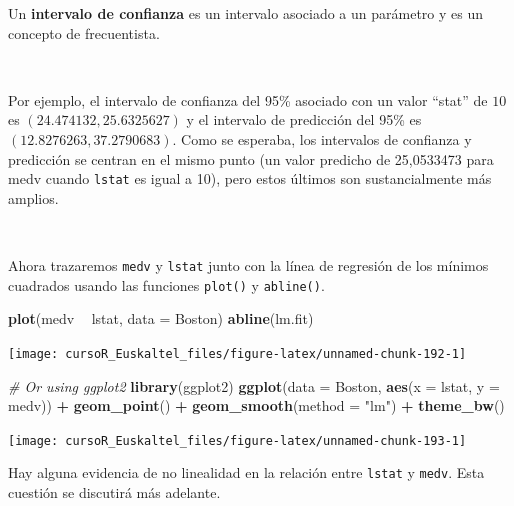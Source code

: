 \documentclass[]{book}
\newenvironment{Shaded}{\begin{snugshade}}{\end{snugshade}}
\newcommand{\KeywordTok}[1]{\textcolor[rgb]{0.13,0.29,0.53}{\textbf{#1}}}
\newcommand{\DataTypeTok}[1]{\textcolor[rgb]{0.13,0.29,0.53}{#1}}
\newcommand{\StringTok}[1]{\textcolor[rgb]{0.31,0.60,0.02}{#1}}
\newcommand{\CommentTok}[1]{\textcolor[rgb]{0.56,0.35,0.01}{\textit{#1}}}
\newcommand{\OperatorTok}[1]{\textcolor[rgb]{0.81,0.36,0.00}{\textbf{#1}}}
\newcommand{\NormalTok}[1]{#1}
\begin{document}
Un \textbf{intervalo de confianza} es un intervalo asociado a un
parámetro y es un concepto de frecuentista.

~

Por ejemplo, el intervalo de confianza del 95\% asociado con un valor
``stat'' de \(10\) es \((24.474132, 25.6325627)\) y el intervalo de
predicción del 95\% es \((12.8276263, 37.2790683)\). Como se esperaba,
los intervalos de confianza y predicción se centran en el mismo punto
(un valor predicho de 25,0533473 para medv cuando \texttt{lstat} es
igual a 10), pero estos últimos son sustancialmente más amplios.

~

Ahora trazaremos \texttt{medv} y \texttt{lstat} junto con la línea de
regresión de los mínimos cuadrados usando las funciones \texttt{plot()}
y \texttt{abline()}.

\begin{Shaded}
\begin{Highlighting}[]
\KeywordTok{plot}\NormalTok{(medv }\OperatorTok{~}\StringTok{ }\NormalTok{lstat, }\DataTypeTok{data =}\NormalTok{ Boston)}
\KeywordTok{abline}\NormalTok{(lm.fit)}
\end{Highlighting}
\end{Shaded}

\begin{center}\texttt{[image: cursoR\_Euskaltel\_files/figure-latex/unnamed-chunk-192-1]} \end{center}

\begin{Shaded}
\begin{Highlighting}[]
\CommentTok{# Or using ggplot2}
\KeywordTok{library}\NormalTok{(ggplot2)}
\KeywordTok{ggplot}\NormalTok{(}\DataTypeTok{data =}\NormalTok{ Boston, }\KeywordTok{aes}\NormalTok{(}\DataTypeTok{x =}\NormalTok{ lstat, }\DataTypeTok{y =}\NormalTok{ medv)) }\OperatorTok{+}
\StringTok{  }\KeywordTok{geom_point}\NormalTok{() }\OperatorTok{+}\StringTok{ }
\StringTok{  }\KeywordTok{geom_smooth}\NormalTok{(}\DataTypeTok{method =} \StringTok{"lm"}\NormalTok{) }\OperatorTok{+}\StringTok{ }
\StringTok{  }\KeywordTok{theme_bw}\NormalTok{()}
\end{Highlighting}
\end{Shaded}

\begin{center}\texttt{[image: cursoR\_Euskaltel\_files/figure-latex/unnamed-chunk-193-1]} \end{center}

Hay alguna evidencia de no linealidad en la relación entre
\texttt{lstat} y \texttt{medv}. Esta cuestión se discutirá más adelante.
\end{document}
